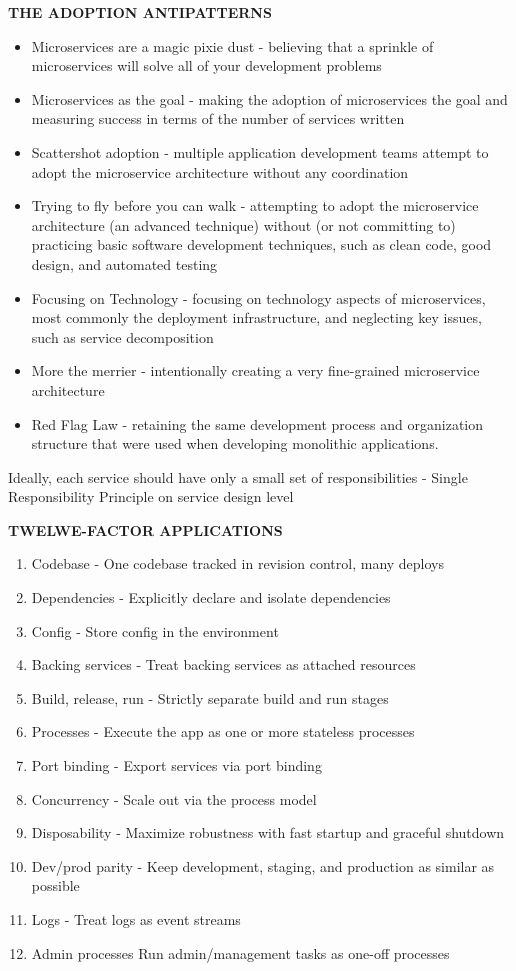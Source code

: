\textbf{THE ADOPTION ANTIPATTERNS}
\begin{itemize}
    \item Microservices are a magic pixie dust - believing that a sprinkle of microservices will solve all of your development problems
    \item Microservices as the goal - making the adoption of microservices the goal and measuring success in terms of the number of services written
    \item Scattershot adoption - multiple application development teams attempt to adopt the microservice architecture without any coordination
    \item Trying to fly before you can walk - attempting to adopt the microservice architecture (an advanced technique) without (or not committing to) practicing basic software development techniques, such as clean code, good design, and automated testing
    \item Focusing on Technology - focusing on technology aspects of microservices, most commonly the deployment infrastructure, and neglecting key issues, such as service decomposition
    \item More the merrier - intentionally creating a very fine-grained microservice architecture
    \item Red Flag Law - retaining the same development process and organization structure that were used when developing monolithic applications.
\end{itemize}

Ideally, each service should have only a small set of responsibilities - Single Responsibility Principle on service design level

\textbf{TWELWE-FACTOR APPLICATIONS}

\begin{enumerate}
    \item Codebase - One codebase tracked in revision control, many deploys
    \item Dependencies - Explicitly declare and isolate dependencies
    \item Config - Store config in the environment
    \item Backing services - Treat backing services as attached resources
    \item Build, release, run - Strictly separate build and run stages
    \item Processes - Execute the app as one or more stateless processes
    \item Port binding - Export services via port binding
    \item Concurrency - Scale out via the process model
    \item Disposability - Maximize robustness with fast startup and graceful shutdown
    \item Dev/prod parity - Keep development, staging, and production as similar as possible
    \item Logs - Treat logs as event streams
    \item Admin processes Run admin/management tasks as one-off processes
\end{enumerate}

